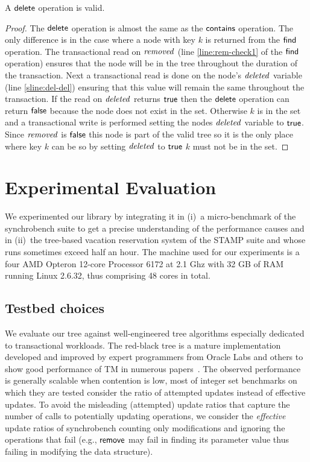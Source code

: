 \begin{theorem}
\label{theorem:delete-valid}
A $\act{delete}$ operation is valid.
\end{theorem}
\begin{proof}
The $\act{delete}$ operation is almost the same as the $\act{contains}$ operation.
The only difference is in the case where a node with key $k$ is returned from the $\act{find}$ operation.
The transactional read on $\ms{removed}$ (line \ref{line:rem-check1} of the $\act{find}$ operation) ensures that the node will be in the tree throughout the duration of the transaction.
Next a transactional read is done on the node's $\ms{deleted}$ variable (line \ref{sline:del-del}) ensuring that this value will remain the same throughout the transaction.
If the read on $\ms{deleted}$ returns $\lit{true}$ then the $\act{delete}$ operation can return $\lit{false}$ because the node does not exist in the set.
Otherwise $k$ is in the set and a transactional write is performed setting the nodes $\ms{deleted}$ variable to $\lit{true}$.
Since $\ms{removed}$ is $\lit{false}$ this node is part of the valid tree so it is the only place where key $k$ can be so by setting
$\ms{deleted}$ to $\lit{true}$ $k$ must not be in the set.
\end{proof}

\section{Experimental Evaluation}\label{sec:expe}
We experimented our library by integrating it in (i)~a micro-benchmark of the synchrobench suite %
to get a precise understanding of the performance causes and in (ii)~the tree-based vacation 
reservation system of the STAMP suite 
and whose
runs sometimes exceed half an hour.
The machine used for our experiments is a four AMD Opteron 12-core Processor 6172 at 2.1 Ghz with 32 GB of RAM running Linux 2.6.32, thus comprising 48 cores in total.

\subsection{Testbed choices}
We evaluate our tree against well-engineered 
tree algorithms especially dedicated to transactional workloads.
%
The red-black tree is a mature implementation developed and improved by expert programmers from Oracle Labs and 
others to show good performance of TM in numerous papers~\cite{DSS06,HLMS03,CCKO08,HK08,FFR08,YNW+08,DFGG11}.
The observed performance is generally scalable when contention is low, most of integer set benchmarks on which they are tested 
consider the ratio of attempted updates instead of effective updates. 
To avoid the misleading (attempted) update ratios that capture the number of calls to potentially updating operations, we consider the \emph{effective} update ratios of synchrobench 
counting only modifications and ignoring the operations that fail (e.g., $\act{remove}$ may fail in finding its parameter value thus failing in modifying the data structure).

